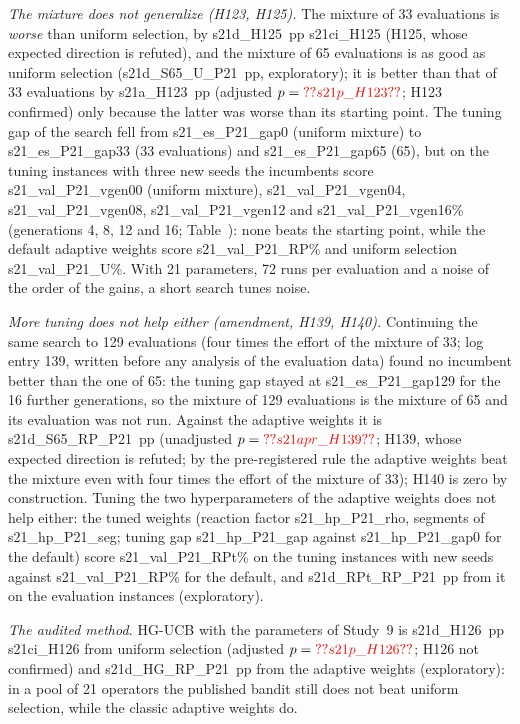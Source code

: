 \emph{The mixture does not generalize (H123, H125).} The mixture of 33 evaluations is \emph{worse} than uniform selection, by \num{s21d_H125}~pp \num{s21ci_H125} (H125, whose expected direction is refuted), and the mixture of 65 evaluations is as good as uniform selection (\num{s21d_S65_U_P21}~pp, exploratory); it is better than that of 33 evaluations by \num{s21a_H123}~pp (adjusted $p=\num{s21p_H123}$; H123 confirmed) only because the latter was worse than its starting point. The tuning gap of the search fell from \num{s21_es_P21_gap0} (uniform mixture) to \num{s21_es_P21_gap33} (33 evaluations) and \num{s21_es_P21_gap65} (65), but on the tuning instances with three new seeds the incumbents score \num{s21_val_P21_vgen00} (uniform mixture), \num{s21_val_P21_vgen04}, \num{s21_val_P21_vgen08}, \num{s21_val_P21_vgen12} and \num{s21_val_P21_vgen16}\% (generations 4, 8, 12 and 16; Table~): none beats the starting point, while the default adaptive weights score \num{s21_val_P21_RP}\% and uniform selection \num{s21_val_P21_U}\%. With 21 parameters, 72 runs per evaluation and a noise of the order of the gains, a short search tunes noise.

\emph{More tuning does not help either (amendment, H139, H140).} Continuing the same search to 129 evaluations (four times the effort of the mixture of 33; log entry 139, written before any analysis of the evaluation data) found no incumbent better than the one of 65: the tuning gap stayed at \num{s21_es_P21_gap129} for the 16 further generations, so the mixture of 129 evaluations is the mixture of 65 and its evaluation was not run. Against the adaptive weights it is \num{s21d_S65_RP_P21}~pp (unadjusted $p=\num{s21apr_H139}$; H139, whose expected direction is refuted; by the pre-registered rule the adaptive weights beat the mixture even with four times the effort of the mixture of 33); H140 is zero by construction. Tuning the two hyperparameters of the adaptive weights does not help either: the tuned weights (reaction factor \num{s21_hp_P21_rho}, segments of \num{s21_hp_P21_seg}; tuning gap \num{s21_hp_P21_gap} against \num{s21_hp_P21_gap0} for the default) score \num{s21_val_P21_RPt}\% on the tuning instances with new seeds against \num{s21_val_P21_RP}\% for the default, and \num{s21d_RPt_RP_P21}~pp from it on the evaluation instances (exploratory).

\emph{The audited method.} HG-UCB with the parameters of Study~9 is \num{s21d_H126}~pp \num{s21ci_H126} from uniform selection (adjusted $p=\num{s21p_H126}$; H126 not confirmed) and \num{s21d_HG_RP_P21}~pp from the adaptive weights (exploratory): in a pool of 21 operators the published bandit still does not beat uniform selection, while the classic adaptive weights do.

